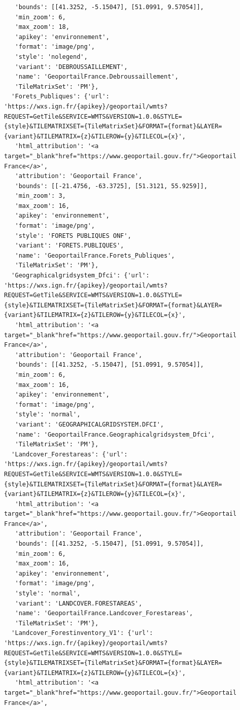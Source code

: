 \documentclass[
  letterpaper,
  DIV=11,
  numbers=noendperiod]{scrreprt}
\begin{document}
\begin{verbatim}
   'bounds': [[41.3252, -5.15047], [51.0991, 9.57054]],
   'min_zoom': 6,
   'max_zoom': 18,
   'apikey': 'environnement',
   'format': 'image/png',
   'style': 'nolegend',
   'variant': 'DEBROUSSAILLEMENT',
   'name': 'GeoportailFrance.Debroussaillement',
   'TileMatrixSet': 'PM'},
  'Forets_Publiques': {'url': 'https://wxs.ign.fr/{apikey}/geoportail/wmts?REQUEST=GetTile&SERVICE=WMTS&VERSION=1.0.0&STYLE={style}&TILEMATRIXSET={TileMatrixSet}&FORMAT={format}&LAYER={variant}&TILEMATRIX={z}&TILEROW={y}&TILECOL={x}',
   'html_attribution': '<a target="_blank"href="https://www.geoportail.gouv.fr/">Geoportail France</a>',
   'attribution': 'Geoportail France',
   'bounds': [[-21.4756, -63.3725], [51.3121, 55.9259]],
   'min_zoom': 3,
   'max_zoom': 16,
   'apikey': 'environnement',
   'format': 'image/png',
   'style': 'FORETS PUBLIQUES ONF',
   'variant': 'FORETS.PUBLIQUES',
   'name': 'GeoportailFrance.Forets_Publiques',
   'TileMatrixSet': 'PM'},
  'Geographicalgridsystem_Dfci': {'url': 'https://wxs.ign.fr/{apikey}/geoportail/wmts?REQUEST=GetTile&SERVICE=WMTS&VERSION=1.0.0&STYLE={style}&TILEMATRIXSET={TileMatrixSet}&FORMAT={format}&LAYER={variant}&TILEMATRIX={z}&TILEROW={y}&TILECOL={x}',
   'html_attribution': '<a target="_blank"href="https://www.geoportail.gouv.fr/">Geoportail France</a>',
   'attribution': 'Geoportail France',
   'bounds': [[41.3252, -5.15047], [51.0991, 9.57054]],
   'min_zoom': 6,
   'max_zoom': 16,
   'apikey': 'environnement',
   'format': 'image/png',
   'style': 'normal',
   'variant': 'GEOGRAPHICALGRIDSYSTEM.DFCI',
   'name': 'GeoportailFrance.Geographicalgridsystem_Dfci',
   'TileMatrixSet': 'PM'},
  'Landcover_Forestareas': {'url': 'https://wxs.ign.fr/{apikey}/geoportail/wmts?REQUEST=GetTile&SERVICE=WMTS&VERSION=1.0.0&STYLE={style}&TILEMATRIXSET={TileMatrixSet}&FORMAT={format}&LAYER={variant}&TILEMATRIX={z}&TILEROW={y}&TILECOL={x}',
   'html_attribution': '<a target="_blank"href="https://www.geoportail.gouv.fr/">Geoportail France</a>',
   'attribution': 'Geoportail France',
   'bounds': [[41.3252, -5.15047], [51.0991, 9.57054]],
   'min_zoom': 6,
   'max_zoom': 16,
   'apikey': 'environnement',
   'format': 'image/png',
   'style': 'normal',
   'variant': 'LANDCOVER.FORESTAREAS',
   'name': 'GeoportailFrance.Landcover_Forestareas',
   'TileMatrixSet': 'PM'},
  'Landcover_Forestinventory_V1': {'url': 'https://wxs.ign.fr/{apikey}/geoportail/wmts?REQUEST=GetTile&SERVICE=WMTS&VERSION=1.0.0&STYLE={style}&TILEMATRIXSET={TileMatrixSet}&FORMAT={format}&LAYER={variant}&TILEMATRIX={z}&TILEROW={y}&TILECOL={x}',
   'html_attribution': '<a target="_blank"href="https://www.geoportail.gouv.fr/">Geoportail France</a>',

\end{verbatim}
\end{document}
